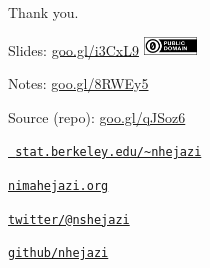 \documentclass[12pt,t,handout]{beamer}
\begin{document}
\begin{frame}[c]{Thank you.}

\Large
Slides: \href{https://goo.gl/i3CxL9}{goo.gl/i3CxL9} \quad
\includegraphics[height=5mm]{Figs/cc-zero.png}

\vspace{3mm}
Notes: \href{https://goo.gl/8RWEy5}{goo.gl/8RWEy5}

\vspace{3mm}
Source (repo): \href{https://goo.gl/qJSoz6}{goo.gl/qJSoz6}

\vspace{3mm}
\href{https://www.stat.berkeley.edu/~nhejazi}{\tt
  stat.berkeley.edu/\textasciitilde{}nhejazi}

\vspace{3mm}
\href{http://nimahejazi.org}{\tt nimahejazi.org}

\vspace{3mm}
\href{https://twitter.com/nshejazi}{\tt twitter/@nshejazi}

\vspace{3mm}
\href{https://github.com/nhejazi}{\tt github/nhejazi}


\end{frame}

\end{document}

